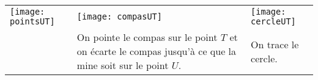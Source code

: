 \begin{methode*1}
\begin{exemple*1}
\begin{tabularx}{\linewidth}{X|X|X}
 \texttt{[image: pointsUT]} &  \texttt{[image: compasUT]} & \texttt{[image: cercleUT]} \\ 
  & \multicolumn{1}{|p{3cm}|}{On pointe le compas sur le point $T$ et on écarte le compas jusqu'à ce que la mine soit sur le point $U$.} & On trace le cercle. \\
\end{tabularx} 

 \end{exemple*1}

\exercice %



 
\end{methode*1}





